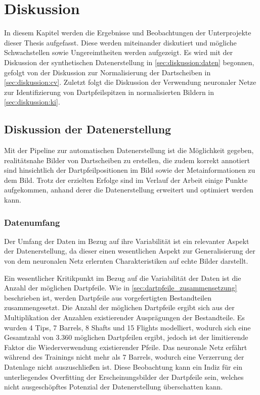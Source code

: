 
\chapter{Diskussion}
\label{cha:diskussion}

In diesem Kapitel werden die Ergebnisse und Beobachtungen der Unterprojekte dieser Thesis aufgefasst. Diese werden miteinander diskutiert und mögliche Schwachstellen sowie Ungereimtheiten werden aufgezeigt. Es wird mit der Diskussion der synthetischen Datenerstellung in \autoref{sec:diskussion:daten} begonnen, gefolgt von der Diskussion zur Normalisierung der Dartscheiben in \autoref{sec:diskussion:cv}. Zuletzt folgt die Diskussion der Verwendung neuronaler Netze zur Identifizierung von Dartpfeilspitzen in normalisierten Bildern in \autoref{sec:diskussion:ki}.


\section{Diskussion der Datenerstellung}
\label{sec:diskussion:daten}

Mit der Pipeline zur automatischen Datenerstellung ist die Möglichkeit gegeben, realitätsnahe Bilder von Dartscheiben zu erstellen, die zudem korrekt annotiert sind hinsichtlich der Dartpfeilpositionen im Bild sowie der Metainformationen zu dem Bild. Trotz der erzielten Erfolge sind im Verlauf der Arbeit einige Punkte aufgekommen, anhand derer die Datenerstellung erweitert und optimiert werden kann.

\subsection{Datenumfang}

Der Umfang der Daten im Bezug auf ihre Variabilität ist ein relevanter Aspekt der Datenerstellung, da dieser einen wesentlichen Aspekt zur Generalisierung der von dem neuronalen Netz erlernten Charakteristiken auf echte Bilder darstellt.

Ein wesentlicher Kritikpunkt im Bezug auf die Variabilität der Daten ist die Anzahl der möglichen Dartpfeile. Wie in \autoref{sec:dartpfeile_zusammensetzung} beschrieben ist, werden Dartpfeile aus vorgefertigten Bestandteilen zusammengesetzt. Die Anzahl der möglichen Dartpfeile ergibt sich aus der Multiplikation der Anzahlen existierender Ausprägungen der Bestandteile. Es wurden 4 Tips, 7 Barrels, 8 Shafts und 15 Flights modelliert, wodurch sich eine Gesamtzahl von $3.360$ möglichen Dartpfeilen ergibt, jedoch ist der limitierende Faktor die Wiederverwendung existierender Pfeile. Das neuronale Netz erfährt während des Trainings nicht mehr als 7 Barrels, wodurch eine Verzerrung der Datenlage nicht auszuschließen ist. Diese Beobachtung kann ein Indiz für ein unterliegendes Overfitting der Erscheinungsbilder der Dartpfeile sein, welches nicht ausgeschöpftes Potenzial der Datenerstellung überschatten kann.

